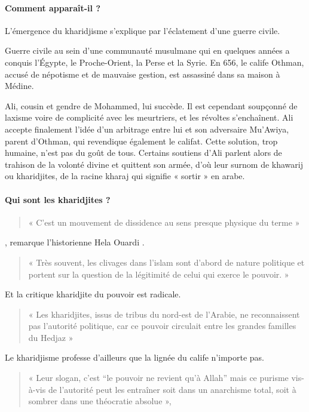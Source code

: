 \paragraph{Comment apparaît-il ?}
L’émergence du kharidjisme s’explique par l’éclatement d’une guerre civile.
\begin{Def}
Guerre civile au sein d’une communauté musulmane qui en quelques années a conquis l’Égypte, le Proche-Orient, la Perse et la Syrie. En 656, le calife Othman, accusé de népotisme et de mauvaise gestion, est assassiné dans sa maison à Médine. 

\end{Def}
Ali, cousin et gendre de Mohammed, lui succède. Il est cependant soupçonné de laxisme voire de complicité avec les meurtriers, et les révoltes s’enchaînent.
Ali accepte finalement l’idée d’un arbitrage entre lui et son adversaire Mu’Awiya, parent d’Othman, qui revendique également le califat. Cette solution, trop humaine, n’est pas du goût de tous. Certains soutiens d’Ali parlent alors de trahison de la volonté divine et quittent son armée, d’où leur surnom de khawarij ou kharidjites, de la racine kharaj qui signifie « sortir » en arabe.

\paragraph{Qui sont les kharidjites ?}
\begin{quote}
« C’est un mouvement de dissidence au sens presque physique du terme »    
\end{quote}
, remarque l’historienne Hela Ouardi .  
\begin{quote}
    « Très souvent, les clivages dans l’islam sont d’abord de nature politique et portent sur la question de la légitimité de celui qui exerce le pouvoir. »
\end{quote}

Et la critique kharidjite du pouvoir est radicale. 
\begin{quote}
« Les kharidjites, issus de tribus du nord-est de l’Arabie, ne reconnaissent pas l’autorité politique, car ce pouvoir circulait entre les grandes familles du Hedjaz   »    
\end{quote}

Le kharidjisme professe d’ailleurs que la lignée du calife n’importe pas. 
\begin{quote}
    « Leur slogan, c’est “le pouvoir ne revient qu’à Allah” mais ce purisme vis-à-vis de l’autorité peut les entraîner soit dans un anarchisme total, soit à sombrer dans une théocratie absolue »,
\end{quote}

